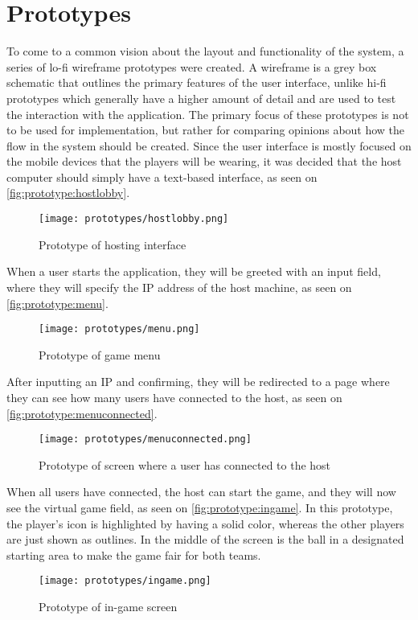 \section{Prototypes}
To come to a common vision about the layout and functionality of the system, a series of lo-fi wireframe prototypes were created.
A wireframe is a grey box schematic that outlines the primary features of the user interface, unlike hi-fi prototypes which generally have a higher amount of detail and are used to test the interaction with the application.
The primary focus of these prototypes is not to be used for implementation, but rather for comparing opinions about how the flow in the system should be created.
Since the user interface is mostly focused on the mobile devices that the players will be wearing, it was decided that the host computer should simply have a text-based interface, as seen on \autoref{fig:prototype:hostlobby}.

\begin{figure}[H]
    \centering
    \texttt{[image: prototypes/hostlobby.png]}
    \caption{Prototype of hosting interface}
    \label{fig:prototype:hostlobby}
\end{figure}

When a user starts the application, they will be greeted with an input field, where they will specify the IP address of the host machine, as seen on \autoref{fig:prototype:menu}. 

\begin{figure}[H]
    \centering
    \texttt{[image: prototypes/menu.png]}
    \caption{Prototype of game menu}
    \label{fig:prototype:menu}
\end{figure}

After inputting an IP and confirming, they will be redirected to a page where they can see how many users have connected to the host, as seen on \autoref{fig:prototype:menuconnected}. 

\begin{figure}[H]
    \centering
    \texttt{[image: prototypes/menuconnected.png]}
    \caption{Prototype of screen where a user has connected to the host}
    \label{fig:prototype:menuconnected}
\end{figure}

When all users have connected, the host can start the game, and they will now see the virtual game field, as seen on \autoref{fig:prototype:ingame}.
In this prototype, the player's icon is highlighted by having a solid color, whereas the other players are just shown as outlines.
In the middle of the screen is the ball in a designated starting area to make the game fair for both teams.

\begin{figure}[H]
    \centering
    \texttt{[image: prototypes/ingame.png]}
    \caption{Prototype of in-game screen}
    \label{fig:prototype:ingame}
\end{figure}
